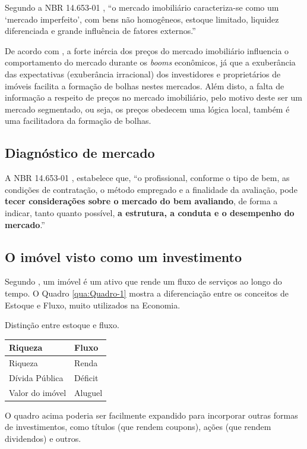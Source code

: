 \documentclass[
	12pt,				%
	oneside,			%
	a4paper,			%
	chapter=TITLE,		%
	section=TITLE,		%
	english,			%
	brazil				%
	]{abntex2}
\begin{document}
Segundo a NBR 14.653-01 \autocite*[x]{NBR1465301}, ``o mercado imobiliário caracteriza-se
como um `mercado imperfeito', com bens não homogêneos, estoque limitado,
liquidez diferenciada e grande influência de fatores externos.''

De acordo com \textcite[p.~3]{ADAMS2010}, a forte inércia dos preços do mercado
imobiliário influencia o comportamento do mercado durante os \emph{booms} econômicos,
já que a exuberância das expectativas (exuberância irracional) dos investidores
e proprietários de imóveis facilita a formação de bolhas nestes mercados. Além
disto, a falta de informação a respeito de preços no mercado imobiliário, pelo
motivo deste ser um mercado segmentado, ou seja, os preços obedecem uma lógica
local, também é uma facilitadora da formação de bolhas.

\hypertarget{diagnuxf3stico-de-mercado}{%
\subsection{Diagnóstico de mercado}\label{diagnuxf3stico-de-mercado}}

A NBR 14.653-01 \autocite*[12]{NBR1465301}, estabelece que, ``o profissional, conforme o
tipo de bem, as condições de contratação, o método empregado e a finalidade da
avaliação, pode \textbf{tecer considerações sobre o mercado do bem avaliando}, de
forma a indicar, tanto quanto possível, \textbf{a estrutura, a conduta e o desempenho
do mercado}.''

\hypertarget{o-imuxf3vel-visto-como-um-investimento}{%
\subsection{O imóvel visto como um investimento}\label{o-imuxf3vel-visto-como-um-investimento}}

Segundo \textcite{Malpezzi2002TheRO}, um imóvel é um ativo que rende um fluxo de serviços
ao longo do tempo. O Quadro \ref{qua:Quadro-1} mostra a diferenciação entre os
conceitos de Estoque e Fluxo, muito utilizados na Economia.
\begin{quadro}[htb]
	\centering
	\caption{\label{qua:Quadro-1}Distinção entre estoque e fluxo.}	
	\begin{tabular}{|l|l|}
		\hline
		\textbf{Riqueza}  & \textbf{Fluxo}\\ \hline
		 Riqueza          & Renda         \\ \hline
		 Dívida Pública   & Déficit       \\ \hline
		 Valor do imóvel  & Aluguel       \\ \hline
	\end{tabular}
\end{quadro}
O quadro acima poderia ser facilmente expandido para incorporar outras formas de
investimentos, como títulos (que rendem coupons), ações (que rendem dividendos)
e outros.
\end{document}
